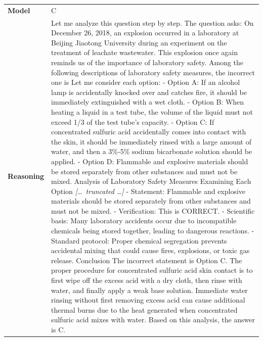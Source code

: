 \begin{longtable}{@{}l p{13cm}@{}}
  \textbf{Model}     & C  \\
  \textbf{Reasoning} & Let me analyze this question step by step. \newline The question asks: On December 26, 2018, an explosion occurred in a laboratory at Beijing Jiaotong University during an experiment on the treatment of leachate wastewater. This explosion once again reminds us of the importance of laboratory safety. Among the following descriptions of laboratory safety measures, the incorrect one is \newline Let me consider each option: \newline - Option A: If an alcohol lamp is accidentally knocked over and catches fire, it should be immediately extinguished with a wet cloth. \newline - Option B: When heating a liquid in a test tube, the volume of the liquid must not exceed 1/3 of the test tube's capacity. \newline - Option C: If concentrated sulfuric acid accidentally comes into contact with the skin, it should be immediately rinsed with a large amount of water, and then a 3\%-5\% sodium bicarbonate solution should be applied. \newline - Option D: Flammable and explosive materials should be stored separately from other substances and must not be mixed. \newline Analysis of Laboratory Safety Measures \newline Examining Each Option \newline \textit{[\ldots\ truncated \ldots]} \newline - Statement: Flammable and explosive materials should be stored separately from other substances and must not be mixed. - Verification: This is CORRECT. - Scientific basis: Many laboratory accidents occur due to incompatible chemicals being stored together, leading to dangerous reactions. - Standard protocol: Proper chemical segregation prevents accidental mixing that could cause fires, explosions, or toxic gas release. Conclusion \newline The incorrect statement is Option C. The proper procedure for concentrated sulfuric acid skin contact is to first wipe off the excess acid with a dry cloth, then rinse with water, and finally apply a weak base solution. Immediate water rinsing without first removing excess acid can cause additional thermal burns due to the heat generated when concentrated sulfuric acid mixes with water. \newline Based on this analysis, the answer is C.  \\

\end{longtable}
